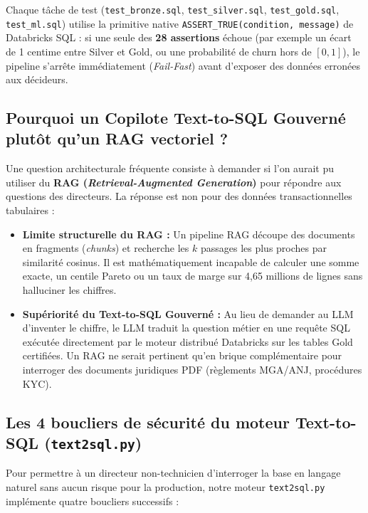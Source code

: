 \documentclass[11pt,a4paper]{article}
\begin{document}
Chaque tâche de test (\texttt{test\_bronze.sql}, \texttt{test\_silver.sql}, \texttt{test\_gold.sql}, \texttt{test\_ml.sql}) utilise la primitive native \texttt{ASSERT\_TRUE(condition, message)} de Databricks SQL : si une seule des \textbf{28 assertions} échoue (par exemple un écart de 1 centime entre Silver et Gold, ou une probabilité de churn hors de $[0, 1]$), le pipeline s'arrête immédiatement (\textit{Fail-Fast}) avant d'exposer des données erronées aux décideurs.

\subsection{Pourquoi un Copilote Text-to-SQL Gouverné plutôt qu'un RAG vectoriel ?}
Une question architecturale fréquente consiste à demander si l'on aurait pu utiliser du \textbf{RAG (\textit{Retrieval-Augmented Generation})} pour répondre aux questions des directeurs. La réponse est non pour des données transactionnelles tabulaires :
\begin{itemize}
    \item \textbf{Limite structurelle du RAG :} Un pipeline RAG découpe des documents en fragments (\textit{chunks}) et recherche les $k$ passages les plus proches par similarité cosinus. Il est mathématiquement incapable de calculer une somme exacte, un centile Pareto ou un taux de marge sur 4,65 millions de lignes sans halluciner les chiffres.
    \item \textbf{Supériorité du Text-to-SQL Gouverné :} Au lieu de demander au LLM d'inventer le chiffre, le LLM traduit la question métier en une requête SQL exécutée directement par le moteur distribué Databricks sur les tables Gold certifiées. Un RAG ne serait pertinent qu'en brique complémentaire pour interroger des documents juridiques PDF (règlements MGA/ANJ, procédures KYC).
\end{itemize}

\subsection{Les 4 boucliers de sécurité du moteur Text-to-SQL (\texttt{text2sql.py})}
Pour permettre à un directeur non-technicien d'interroger la base en langage naturel sans aucun risque pour la production, notre moteur \texttt{text2sql.py} implémente quatre boucliers successifs :
\end{document}
